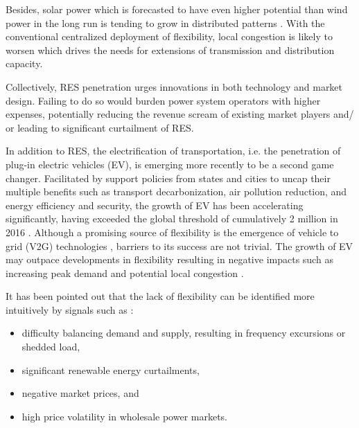 Besides, solar power which is forecasted to have even higher potential than wind power in the long run is tending to grow in distributed patterns \cite{Agency2016,Epia2016,Sawyer2016}. With the conventional centralized deployment of flexibility, local congestion is likely to worsen \cite{Lund2015,STEINKE2013826} which drives the needs for extensions of transmission and distribution capacity.

Collectively, RES penetration urges innovations in both technology and market design. Failing to do so would burden power system operators with higher expenses, potentially reducing the revenue scream of existing market players and/ or leading to significant curtailment of RES.

In addition to RES, the electrification of transportation, i.e. the penetration of plug-in electric vehicles (EV), is emerging more recently to be a second game changer. Facilitated by support policies from states and cities to uncap their multiple benefits such as transport decarbonization, air pollution reduction, and energy efficiency and security, the growth of EV has been accelerating significantly, having exceeded the global threshold of cumulatively 2 million in 2016 \cite{InternationalEnergyAgency2017}. Although a promising source of flexibility is the emergence of vehicle to grid (V2G) technologies \cite{Size2016,Habib2015,Foley2013}, barriers to its success are not trivial. The growth of EV may outpace developments in flexibility resulting in negative impacts such as increasing peak demand and potential local congestion \cite{Green2011,DBLP:journals/corr/PournarasJZFS17}.

It has been pointed out that the lack of flexibility can be identified more intuitively by signals such as \cite{Cochran2014,Wang2017}:
\begin{itemize}
	\item difficulty balancing demand and supply, resulting in frequency excursions or shedded load,
	\item significant renewable energy curtailments,
	\item negative market prices, and
	\item high price volatility in wholesale power markets.
\end{itemize}

